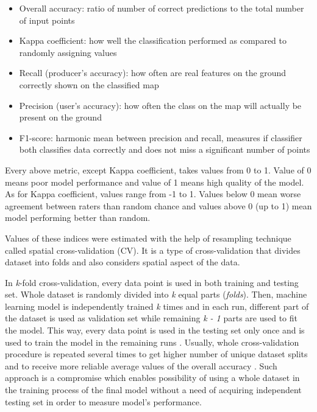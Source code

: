 \documentclass{amuthesis}
\begin{document}
\begin{itemize}
\item
  Overall accuracy: ratio of number of correct predictions to the total
  number of input points
\item
  Kappa coefficient: how well the classification performed as compared
  to randomly assigning values
\item
  Recall (producer's accuracy): how often are real features on the
  ground correctly shown on the classified map
\item
  Precision (user's accuracy): how often the class on the map will
  actually be present on the ground
\item
  F1-score: harmonic mean between precision and recall, measures if
  classifier both classifies data correctly and does not miss a
  significant number of points
\end{itemize}

Every above metric, except Kappa coefficient, takes values from 0 to 1.
Value of 0 means poor model performance and value of 1 means high
quality of the model. As for Kappa coefficient, values range from -1 to
1. Values below 0 mean worse agreement between raters than random chance
and values above 0 (up to 1) mean model performing better than random.

Values of these indices were estimated with the help of resampling
technique called spatial cross-validation (CV). It is a type of
cross-validation that divides dataset into folds and also considers
spatial aspect of the data.

In \emph{k}-fold cross-validation, every data point is used in both
training and testing set. Whole dataset is randomly divided into
\emph{k} equal parts (\emph{folds}). Then, machine learning model is
independently trained \emph{k} times and in each run, different part of
the dataset is used as validation set while remaining \emph{k - 1} parts
are used to fit the model. This way, every data point is used in the
testing set only once and is used to train the model in the remaining
runs \autocite{jiao_performance_2016}. Usually, whole cross-validation
procedure is repeated several times to get higher number of unique
dataset splits and to receive more reliable average values of the
overall accuracy \autocite{varga_validation_2021}. Such approach is a
compromise which enables possibility of using a whole dataset in the
training process of the final model without a need of acquiring
independent testing set in order to measure model's performance.
\end{document}
